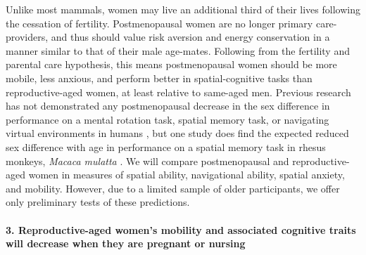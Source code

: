 Unlike most mammals, women may live an additional third of their lives following the cessation of fertility.  Postmenopausal women are no longer primary care-providers, and thus should value risk aversion and energy conservation in a manner similar to that of their male age-mates.  Following from the fertility and parental care hypothesis, this means postmenopausal women should be more mobile, less anxious, and perform better in spatial-cognitive tasks than reproductive-aged women, at least relative to same-aged men.  Previous research has not demonstrated any postmenopausal decrease in the sex difference in performance on a mental rotation task, spatial memory task, or navigating virtual environments in humans \citep{willis1988gender, driscoll2005virtual, moffat2001age}, but one study does find the expected reduced sex difference with age in performance on a spatial memory task in rhesus monkeys, \emph{Macaca mulatta} \citep{lacreuse1999spatial}.  We will compare postmenopausal and reproductive-aged women in measures of spatial ability, navigational ability, spatial anxiety, and mobility.  However, due to a limited sample of older participants, we offer only preliminary tests of these predictions.


  
\paragraph{3.  Reproductive-aged women's mobility and associated cognitive traits will decrease when they are pregnant or nursing}\mbox{}\\

